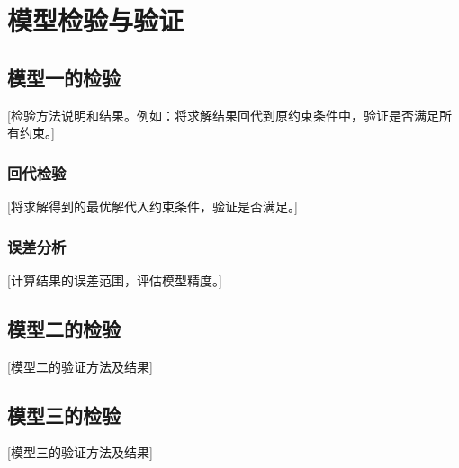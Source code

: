 
\section{模型检验与验证}

\subsection{模型一的检验}

[检验方法说明和结果。例如：将求解结果回代到原约束条件中，验证是否满足所有约束。]

\subsubsection{回代检验}

[将求解得到的最优解代入约束条件，验证是否满足。]

\subsubsection{误差分析}

[计算结果的误差范围，评估模型精度。]

\subsection{模型二的检验}

[模型二的验证方法及结果]

\subsection{模型三的检验}

[模型三的验证方法及结果]
